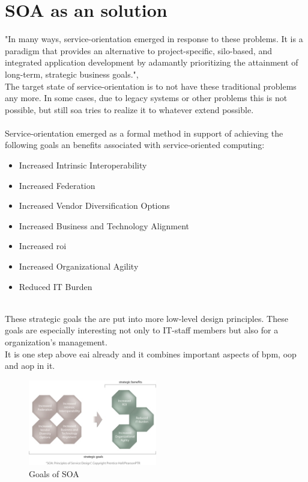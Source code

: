 \documentclass[12pt]{article}
\begin{document}
\section{SOA as an solution} 
"In many ways, service-orientation emerged in response to these problems. It is a paradigm that provides an alternative to project-specific, silo-based, and integrated application development by adamantly prioritizing the attainment of long-term, strategic business goals.",\cite[page 522]{grau} \\
The target state of service-orientation is to not have these traditional problems any more. In some cases, due to legacy systems or other problems this is not possible, but still \gls{soa} tries to realize it to whatever extend possible.
\\ \\
Service-orientation emerged as a formal method in support of achieving the following goals an benefits associated with service-oriented computing: \\
\begin{itemize}
\item Increased Intrinsic Interoperability
\item Increased Federation
\item Increased Vendor Diversification Options 
\item Increased Business and Technology Alignment
\item Increased \gls{roi}
\item Increased Organizational Agility
\item Reduced IT Burden
\end{itemize} \cite[page 23]{grau}\\
These strategic goals the are put into more low-level design principles. These goals are especially interesting not only to IT-staff members but also for a organization's management. \\
It is one step above \gls{eai} already and it combines important aspects of \gls{bpm}, \gls{oop} and \gls{aop} in it. 
\begin{figure}[here!]
	\centering
	\includegraphics[width=0.5\textwidth]{images/page24}
	\caption{Goals of SOA\cite{photos}}
	\label{fig:eaipartofso}
	\end{figure}
\FloatBarrier
\end{document}
